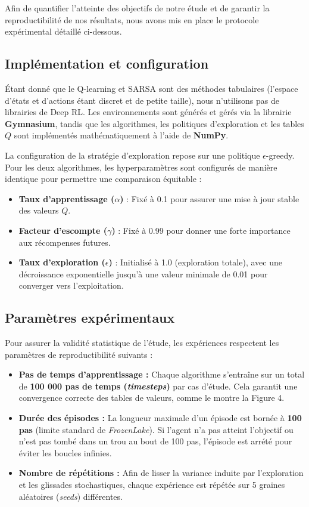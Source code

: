 \documentclass{article}
\begin{document}
Afin de quantifier l'atteinte des objectifs de notre étude et de garantir la reproductibilité de nos résultats, nous avons mis en place le protocole expérimental détaillé ci-dessous.

\subsection{Implémentation et configuration}

Étant donné que le Q-learning et SARSA sont des méthodes tabulaires (l'espace d'états et d'actions étant discret et de petite taille), nous n'utilisons pas de librairies de Deep RL. Les environnements sont générés et gérés via la librairie \textbf{Gymnasium}, tandis que les algorithmes, les politiques d'exploration et les tables $Q$ sont implémentés mathématiquement à l'aide de \textbf{NumPy}.

La configuration de la stratégie d'exploration repose sur une politique $\epsilon$-greedy. Pour les deux algorithmes, les hyperparamètres sont configurés de manière identique pour permettre une comparaison équitable :
\begin{itemize}
    \item \textbf{Taux d'apprentissage ($\alpha$)} : Fixé à 0.1 pour assurer une mise à jour stable des valeurs $Q$.
    \item \textbf{Facteur d'escompte ($\gamma$)} : Fixé à 0.99 pour donner une forte importance aux récompenses futures.
    \item \textbf{Taux d'exploration ($\epsilon$)} : Initialisé à 1.0 (exploration totale), avec une décroissance exponentielle jusqu'à une valeur minimale de 0.01 pour converger vers l'exploitation.
\end{itemize}

\subsection{Paramètres expérimentaux}

Pour assurer la validité statistique de l'étude, les expériences respectent les paramètres de reproductibilité suivants :
\begin{itemize}[noitemsep, topsep=0pt]
    \item \textbf{Pas de temps d'apprentissage :} Chaque algorithme s'entraîne sur un total de \textbf{100 000 pas de temps (\textit{timesteps})} par cas d'étude. Cela garantit une convergence correcte des tables de valeurs, comme le montre la Figure 4.
    \item \textbf{Durée des épisodes :} La longueur maximale d'un épisode est bornée à \textbf{100 pas} (limite standard de \textit{FrozenLake}). Si l'agent n'a pas atteint l'objectif ou n'est pas tombé dans un trou au bout de 100 pas, l'épisode est arrété pour éviter les boucles infinies.
    \item \textbf{Nombre de répétitions :} Afin de lisser la variance induite par l'exploration et les glissades stochastiques, chaque expérience est répétée sur 5 graines aléatoires (\textit{seeds}) différentes.
\end{itemize}
\end{document}

